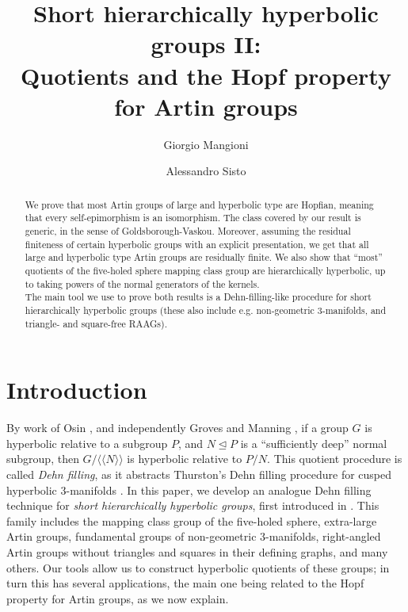 \documentclass[svgnames]{amsart}
\title[Short HHG II]{Short hierarchically hyperbolic groups II:\\
Quotients and the Hopf property for Artin groups}
\author[G. Mangioni]{Giorgio Mangioni}
\author[A. Sisto]{Alessandro Sisto}
\theoremstyle{plain}
\theoremstyle{definition}
\begin{document}
\begin{abstract}
We prove that most Artin groups of large and hyperbolic type are Hopfian, meaning that every self-epimorphism is an isomorphism. The class covered by our result is generic, in the sense of Goldsborough-Vaskou. Moreover, assuming the residual finiteness of certain hyperbolic groups with an explicit presentation, we get that all large and hyperbolic type Artin groups are residually finite. We also show that ``most'' quotients of the five-holed sphere mapping class group are hierarchically hyperbolic, up to taking powers of the normal generators of the kernels. 
\\
The main tool we use to prove both results is a Dehn-filling-like procedure for short hierarchically hyperbolic groups (these also include e.g. non-geometric 3-manifolds, and triangle- and square-free RAAGs). 
\end{abstract}
\maketitle


\setcounter{tocdepth}{1}
\tableofcontents


\section*{Introduction}


By work of Osin \cite{Osin_Dehn_Fill}, and independently Groves and Manning \cite{GM}, if a group $G$ is hyperbolic relative to a subgroup $P$, and $N\unlhd P$ is a ``sufficiently deep'' normal subgroup, then $G/\langle\langle N\rangle\rangle$ is hyperbolic relative to $P/N$. This quotient procedure is called \emph{Dehn filling}, as it abstracts Thurston's Dehn filling procedure for cusped hyperbolic 3-manifolds \cite{Thurston_topology3m}. In this paper, we develop an analogue Dehn filling technique for \emph{short hierarchically hyperbolic groups}, first introduced in \cite{Short_HHG:I}. This family includes the mapping class group of the five-holed sphere, extra-large Artin groups, fundamental groups of non-geometric 3-manifolds, right-angled Artin groups without triangles and squares in their defining graphs, and many others. Our tools allow us to construct hyperbolic quotients of these groups; in turn this has several applications, the main one being related to the Hopf property for Artin groups, as we now explain.
\end{document}
